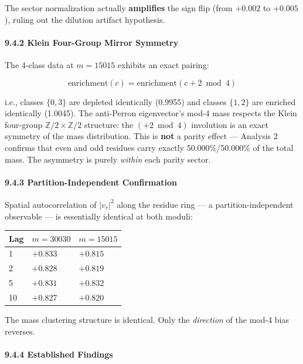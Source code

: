 \documentclass[11pt,letterpaper]{article}
\theoremstyle{definition}
\theoremstyle{remark}
\begin{document}
The sector normalization actually \textbf{amplifies} the sign flip (from $+0.002$ to $+0.005$), ruling out the dilution artifact hypothesis.

\paragraph{9.4.2 Klein Four-Group Mirror Symmetry}\label{klein-four-group-mirror-symmetry}

The 4-class data at $m = 15015$ exhibits an exact pairing:

\[\text{enrichment}(c) = \text{enrichment}(c + 2 \bmod 4)\]

i.e., classes $\{0, 3\}$ are depleted identically (0.9955) and classes $\{1, 2\}$ are enriched identically (1.0045). The anti-Perron eigenvector's mod-4 mass respects the Klein four-group $\mathbb{Z}/2 \times \mathbb{Z}/2$ structure: the $(+2 \bmod 4)$ involution is an exact symmetry of the mass distribution. This is \textbf{not} a parity effect --- Analysis 2 confirms that even and odd residues carry exactly 50.000\%/50.000\% of the total mass. The asymmetry is purely \emph{within} each parity sector.

\paragraph{9.4.3 Partition-Independent Confirmation}\label{partition-independent-confirmation}

Spatial autocorrelation of $|v_r|^2$ along the residue ring --- a partition-independent observable --- is essentially identical at both moduli:

\begin{longtable}[]{@{}lll@{}}
\toprule
Lag & $m = 30030$ & $m = 15015$ \\
\midrule
\endhead
\bottomrule
1 & $+0.833$ & $+0.815$ \\
2 & $+0.828$ & $+0.819$ \\
5 & $+0.831$ & $+0.832$ \\
10 & $+0.827$ & $+0.820$ \\
\end{longtable}

The mass clustering structure is identical. Only the \emph{direction} of the mod-4 bias reverses.

\paragraph{9.4.4 Established Findings}\label{established-findings}
\end{document}
